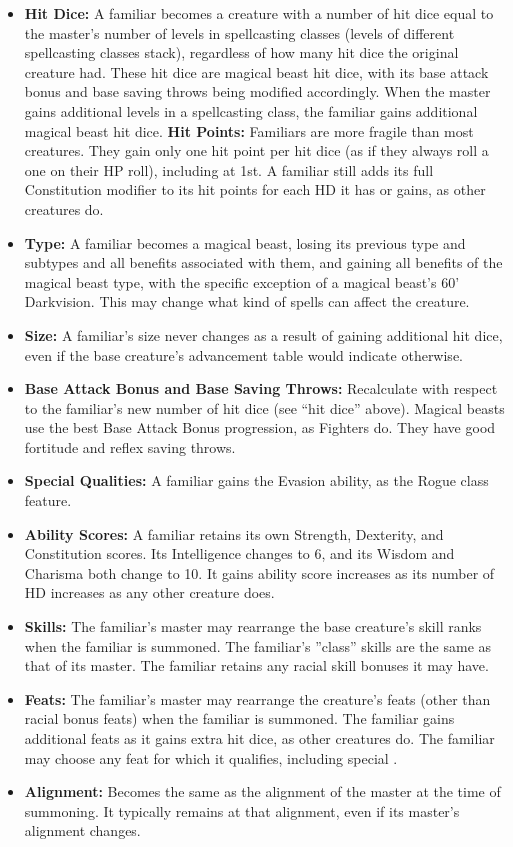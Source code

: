 \begin{itemize}
 \item \textbf{Hit Dice:} A familiar becomes a creature with a number of hit dice equal to the master's number of levels in spellcasting classes (levels of different spellcasting classes stack), 
 regardless of how many hit dice the original creature had. These hit dice are magical beast hit dice, with its base attack bonus and base saving throws being modified accordingly.
 When the master gains additional levels in a spellcasting class, the familiar gains additional magical beast hit dice.
 \subitem \textbf{Hit Points:} Familiars are more fragile than most creatures. They gain only one hit point per hit dice (as if they always roll a one on their HP roll), including at 1st. 
 A familiar still adds its full Constitution modifier to its hit points for each HD it has or gains, as other creatures do.
 \item \textbf{Type:} A familiar becomes a magical beast, losing its previous type and subtypes and all benefits associated with them, and gaining all benefits of the magical beast type, with the specific exception
 of a magical beast's 60' Darkvision. This may change what kind of spells can affect the creature.
 \item \textbf{Size:} A familiar's size never changes as a result of gaining additional hit dice, even if the base creature's advancement table would indicate otherwise.
 \item \textbf{Base Attack Bonus and Base Saving Throws:} Recalculate with respect to the familiar's new number of hit dice (see ``hit dice'' above). 
 Magical beasts use the best Base Attack Bonus progression, as Fighters do. They have good fortitude and reflex saving throws.
 \item \textbf{Special Qualities:} A familiar gains the Evasion ability, as the Rogue class feature.
 \item \textbf{Ability Scores:} A familiar retains its own Strength, Dexterity, and Constitution scores. Its Intelligence changes to 6, and its Wisdom and Charisma both change to 10.
 It gains ability score increases as its number of HD increases as any other creature does.
 \item \textbf{Skills:} The familiar's master may rearrange the base creature's skill ranks when the familiar is summoned. 
 The familiar's ''class'' skills are the same as that of its master. The familiar retains any racial skill bonuses it may have.
 \item \textbf{Feats:} The familiar's master may rearrange the creature's feats (other than racial bonus feats) when the familiar is summoned.
 The familiar gains additional feats as it gains extra hit dice, as other creatures do. The familiar may choose any feat for which it qualifies, including special .
 \item \textbf{Alignment:} Becomes the same as the alignment of the master at the time of summoning. It typically remains at that alignment, even if its master's alignment changes.
\end{itemize}

